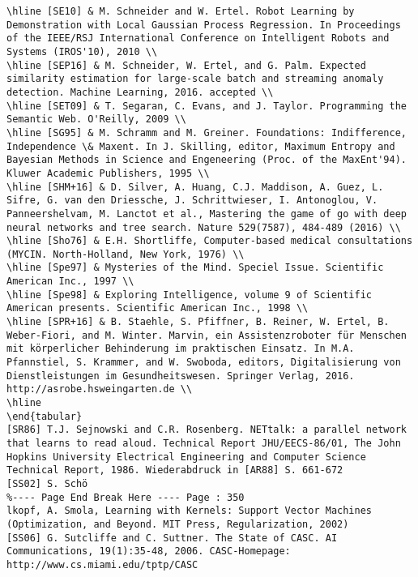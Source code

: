 \documentclass[10pt]{article}
\begin{document}
\begin{verbatim}
\hline [SE10] & M. Schneider and W. Ertel. Robot Learning by Demonstration with Local Gaussian Process Regression. In Proceedings of the IEEE/RSJ International Conference on Intelligent Robots and Systems (IROS'10), 2010 \\
\hline [SEP16] & M. Schneider, W. Ertel, and G. Palm. Expected similarity estimation for large-scale batch and streaming anomaly detection. Machine Learning, 2016. accepted \\
\hline [SET09] & T. Segaran, C. Evans, and J. Taylor. Programming the Semantic Web. O'Reilly, 2009 \\
\hline [SG95] & M. Schramm and M. Greiner. Foundations: Indifference, Independence \& Maxent. In J. Skilling, editor, Maximum Entropy and Bayesian Methods in Science and Engeneering (Proc. of the MaxEnt'94). Kluwer Academic Publishers, 1995 \\
\hline [SHM+16] & D. Silver, A. Huang, C.J. Maddison, A. Guez, L. Sifre, G. van den Driessche, J. Schrittwieser, I. Antonoglou, V. Panneershelvam, M. Lanctot et al., Mastering the game of go with deep neural networks and tree search. Nature 529(7587), 484-489 (2016) \\
\hline [Sho76] & E.H. Shortliffe, Computer-based medical consultations (MYCIN. North-Holland, New York, 1976) \\
\hline [Spe97] & Mysteries of the Mind. Speciel Issue. Scientific American Inc., 1997 \\
\hline [Spe98] & Exploring Intelligence, volume 9 of Scientific American presents. Scientific American Inc., 1998 \\
\hline [SPR+16] & B. Staehle, S. Pfiffner, B. Reiner, W. Ertel, B. Weber-Fiori, and M. Winter. Marvin, ein Assistenzroboter für Menschen mit körperlicher Behinderung im praktischen Einsatz. In M.A. Pfannstiel, S. Krammer, and W. Swoboda, editors, Digitalisierung von Dienstleistungen im Gesundheitswesen. Springer Verlag, 2016. http://asrobe.hsweingarten.de \\
\hline
\end{tabular}
[SR86] T.J. Sejnowski and C.R. Rosenberg. NETtalk: a parallel network that learns to read aloud. Technical Report JHU/EECS-86/01, The John Hopkins University Electrical Engineering and Computer Science Technical Report, 1986. Wiederabdruck in [AR88] S. 661-672
[SS02] S. Schö
%---- Page End Break Here ---- Page : 350
lkopf, A. Smola, Learning with Kernels: Support Vector Machines (Optimization, and Beyond. MIT Press, Regularization, 2002)
[SS06] G. Sutcliffe and C. Suttner. The State of CASC. AI Communications, 19(1):35-48, 2006. CASC-Homepage: http://www.cs.miami.edu/tptp/CASC

\end{verbatim}
\end{document}
